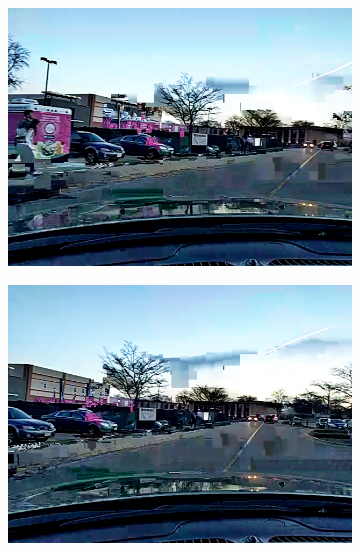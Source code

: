 \begin{figure}[ht]
\begin{subfigure}[t]{0.25\textwidth}
    \includegraphics[width=\linewidth]{Figs/RTDrive/evaluation/frames/default_2.png}
  \end{subfigure}%
  \begin{subfigure}[t]{0.25\textwidth}
    \includegraphics[width=\linewidth]{Figs/RTDrive/evaluation/frames/default_3.png}
  \end{subfigure}%
  \label{default_encoding_images}
  

\end{figure}
